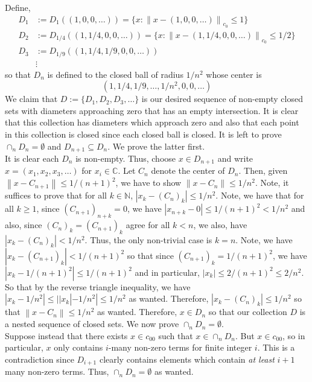 \documentclass{article}
\newcommand{\norm}[1]{\left\lVert#1\right\rVert}
\begin{document}
    \begin{Answer}
        Define,
        \begin{align*}
            D_1 &:= D_1((1,0,0,\hdots)) = \{x: \norm{x-(1,0,0,\hdots)}_{c_{0}}\leq 1\} \\
            D_2 &:= D_{1/4}((1,1/4,0,0,\hdots)) = \{x: \norm{x-(1,1/4,0,0,\hdots)}_{c_0}\leq 1/2\} \\
            D_3 &:= D_{1/9}((1,1/4,1/9,0,0,\hdots)) \\
            &\vdots
        \end{align*}
        so that $D_n$ is defined to the closed ball of radius $1/n^2$ whose center is 
        \[ (1,1/4,1/9,\hdots,1/n^2,0,0,\hdots) \]
        We claim that $D := \{D_1,D_2,D_3,\hdots\}$ is our desired sequence of non-empty closed sets with diameters approaching zero that has
        an empty intersection. It is clear that this collection has diameters which approach zero and also that each point in this
        collection is closed since each closed ball is closed. It is left to prove $\cap_n D_n = \emptyset$ and $D_{n+1}\subseteq D_n$. We prove
        the latter first.\\

        It is clear each $D_n$ is non-empty. Thus, choose $x\in D_{n+1}$ and write $x = (x_1,x_2,x_3,\hdots)$ for $x_i\in\mathbb{C}$.
        Let $C_n$ denote the center of $D_n$. Then, given $\norm{x-C_{n+1}}\leq 1/(n+1)^2$, we have to show $\norm{x-C_n}\leq 1/n^2$.
        Note, it suffices to prove that for all $k\in\mathbb{N}$, $|x_k - (C_n)_k|\leq 1/n^2$.
        Note, we have that for all $k\geq 1$, since $(C_{n+1})_{n+k}=0$, we have $|x_{n+k} - 0|\leq 1/(n+1)^2 < 1/n^2$
        and also, since $(C_n)_k = (C_{n+1})_k$ agree for all $k<n$, we also, have $|x_k - (C_n)_k|<1/n^2$. Thus, the only non-trivial case
        is $k = n$. Note, we have $|x_k - (C_{n+1})_k| < 1/(n+1)^2$ so that since $(C_{n+1})_k = 1/(n+1)^2$, we have
        $|x_k - 1/(n+1)^2| \leq 1/(n+1)^2$ and in particular, $|x_k|\leq 2/(n+1)^2\leq 2/n^2$. So that by the reverse triangle inequality, we have
        $|x_k - 1/n^2| \leq ||x_k|-1/n^2| \leq 1/n^2$ as wanted. Therefore, $|x_k-(C_n)_k|\leq 1/n^2$ so that $\norm{x - C_n}\leq 1/n^2$ as wanted.
        Therefore, $x\in D_n$ so that our collection $D$ is a nested sequence of closed sets. We now prove $\cap_n D_n = \emptyset$.\\

        Suppose instead that there exists $x\in c_{00}$ such that $x\in \cap_n D_n$. But $x\in c_{00}$, so in particular, $x$ only contains
        $i$-many non-zero terms for finite integer $i$. This is a contradiction since $D_{i+1}$ clearly contains elements which contain 
        \textit{at least} $i+1$ many non-zero terms. Thus, $\cap_n D_n = \emptyset$ as wanted.
    \end{Answer}
\end{document}
